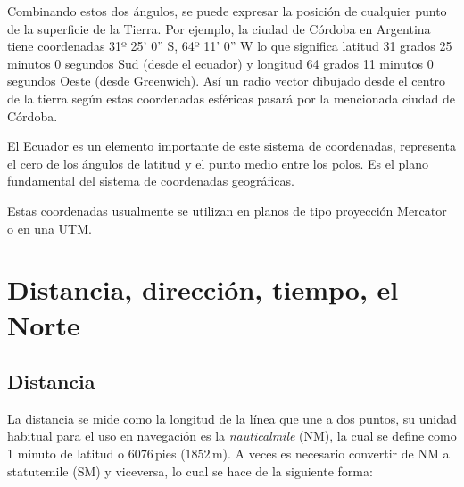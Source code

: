 Combinando estos dos \'angulos, se puede expresar la posici\'on de cualquier punto de la superficie de la Tierra. Por ejemplo, 
la ciudad de C\'ordoba en Argentina tiene coordenadas 31º 25' 0'' S, 64º 11' 0'' W lo que significa
latitud 31 grados 25 minutos 0 segundos Sud (desde el ecuador) y longitud 64 grados 11 minutos 0 segundos Oeste (desde Greenwich). 
As\'i un radio vector dibujado desde el centro de la tierra seg\'un estas coordenadas esf\'ericas pasar\'a por la mencionada ciudad de C\'ordoba.

El Ecuador es un elemento importante de este sistema de coordenadas, representa el cero de los \'angulos de latitud y el punto medio entre los polos. Es el plano fundamental del sistema de coordenadas geogr\'aficas.
    


Estas coordenadas usualmente se utilizan en planos de tipo proyecci\'on Mercator o en una \ac{UTM}. %


 \section{Distancia, direcci\'on, tiempo, el Norte}
 \label{sec:distancia.direccion.tiempo}

 \subsection{Distancia}
 \label{sec:distancia}

 La distancia se mide como la longitud de la l\'inea que une a dos puntos, su unidad habitual para el uso en navegaci\'on es la \emph{\gls{nauticalmile}} (NM), la cual se define como 1 minuto de latitud o $6076$\,pies ($1852$\,m). A veces es necesario convertir de NM a \gls{statutemile} (SM) y viceversa, lo cual se hace de la siguiente forma:

